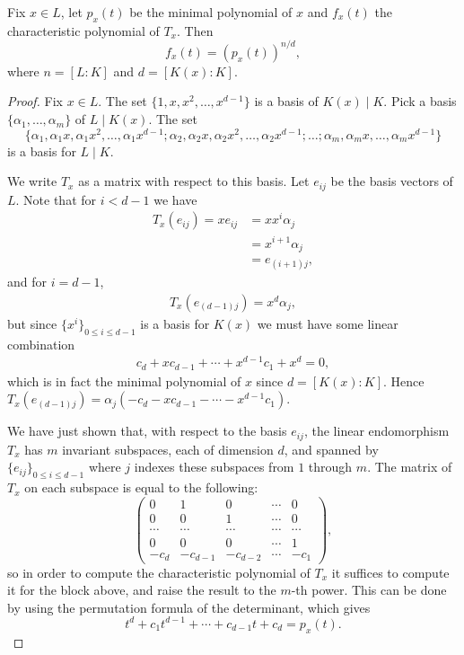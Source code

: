 \begin{prop}
	Fix $x\in L$, let $p_x(t)$ be the minimal polynomial of $x$ and $f_x(t)$ the characteristic polynomial of $T_x$. Then
	\[
		f_x(t) = (p_x(t))^{n/d},
	\]
	where $n=[L:K]$ and $d=[K(x):K]$.
\end{prop}
\begin{proof}
	Fix $x\in L$. The set $\{1,x,x^2,\dots,x^{d-1}\}$ is a basis of $K(x)\mid K$. Pick a basis $\{\alpha_1,\dots,\alpha_m\}$ of $L\mid K(x)$. The set 
	\[
		\{\alpha_1, \alpha_1 x,\alpha_1 x^2, \dots, \alpha_1 x^{d-1}; \alpha_2, \alpha_2 x, \alpha_2 x^2, \dots, \alpha_2 x^{d-1}; \dots ; \alpha_m, \alpha_m x, \dots, \alpha_m x^{d-1}\}
	\]
	is a basis for $L\mid K$.

	We write $T_x$ as a matrix with respect to this basis. Let $e_{ij}$ be the basis vectors of $L$. Note that for $i<d-1$ we have
	\begin{align*}
		T_x(e_{ij}) = x e_{ij} &= x x^i \alpha_j\\
			&= x^{i+1} \alpha_j\\
			&= e_{(i+1)j},
	\end{align*}
	and for $i=d-1$,
	\begin{align*}
		T_x(e_{(d-1)j}) = x^d \alpha_j,
	\end{align*}
	but since $\{x^i\}_{0\leq i \leq d-1}$ is a basis for $K(x)$ we must have some linear combination 
	\begin{align*}
		c_d + x c_{d-1} + \cdots + x^{d-1} c_1 + x^d = 0,
	\end{align*}
	which is in fact the minimal polynomial of $x$ since $d=[K(x):K]$. Hence $T_x(e_{(d-1)j}) = \alpha_j (-c_d - x c_{d-1} - \cdots - x^{d-1} c_1)$.
	
	We have just shown that, with respect to the basis $e_{ij}$, the linear endomorphism $T_x$ has $m$ invariant subspaces, each of dimension $d$, and spanned by $\{e_{ij}\}_{0\leq i\leq d-1}$ where $j$ indexes these subspaces from $1$ through $m$. The matrix of $T_x$ on each subspace is equal to the following:
	\[
	\begin{pmatrix}
		0 & 1 & 0 & \cdots & 0\\
		0 & 0 & 1 & \cdots & 0\\
		\cdots & \cdots & \cdots & \cdots & \cdots\\
		0 & 0 & 0 & \cdots & 1\\
		-c_d & -c_{d-1} & -c_{d-2} & \cdots & -c_1
	\end{pmatrix},
	\]
	so in order to compute the characteristic polynomial of $T_x$ it suffices to compute it for the block above, and raise the result to the $m$-th power. This can be done by using the permutation formula of the determinant, which gives
	\[
		t^d + c_1 t^{d-1} + \cdots + c_{d-1} t + c_d = p_x(t).
	\]

\end{proof}

